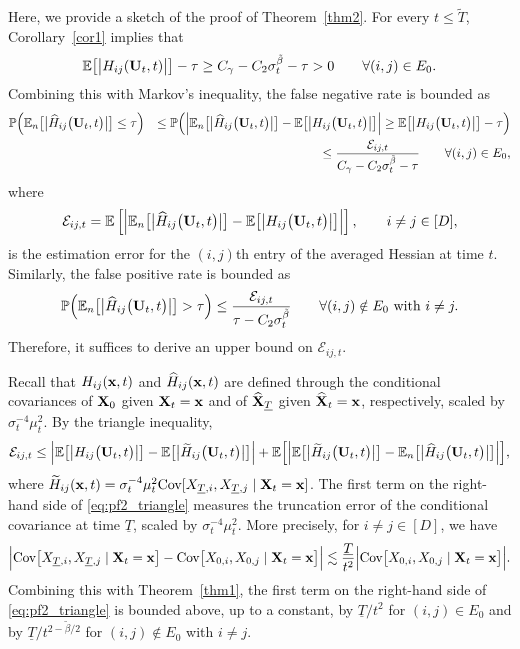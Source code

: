 \documentclass[11pt,a4paper,final]{article}
\numberwithin{equation}{section}
\theoremstyle{remark}
\def\cE{\mathcal E}
\newcommand{\bU}{{\bf U}}
\newcommand{\bx}{{\bf x}}
\newcommand{\bX}{{\bf X}}
\newcommand{\bbE}{{\mathbb E}}
\newcommand{\bbP}{{\mathbb P}}
\newcommand{\be}{\begin{equation}}
\newcommand{\ee}{\end{equation}}
\newcommand{\bean}{\setlength\arraycolsep{1pt}\begin{eqnarray*}}
\newcommand{\eean}{\end{eqnarray*}}
\begin{document}
Here, we provide a sketch of the proof of Theorem~\ref{thm2}.
For every $t \leq {\widetilde T}$, Corollary~\ref{cor1} implies that
\bean
\bbE \big[ \big\vert H_{ij} (\bU_{t},t) \big\vert \big] -\tau \geq C_{\gamma} - C_{2} \sigma_{t}^{\tilde \beta} - \tau > 0
\qquad  \forall (i,j) \in E_{0}.
\eean
Combining this with Markov's inequality, the false negative rate is bounded as
\bean
\bbP  \Big( \bbE_{n} \big[  \big\vert \widehat H_{ij} \big( \bU_{t} , t \big)  \big\vert \big] \leq \tau \Big)
&& \leq  \bbP \Big( \Big\vert \bbE_{n} \big[  \big\vert \widehat H_{ij} \big( \bU_{t} , t \big)  \big\vert \big] - \bbE \big[  \big\vert  H_{ij} \big(  \bU_{t} , t \big)  \big\vert \big] \Big\vert
\geq \bbE \big[  \big\vert  H_{ij} \big( \bU_{t}, t \big)  \big\vert \big]  - \tau
\Big)
\\
&& \leq \frac{\cE_{ij,t}}{ C_{\gamma} - C_{2} \sigma_{t}^{\tilde \beta} - \tau } \qquad \forall (i,j) \in E_{0},
\eean
where
\bean
\cE_{ij,t}
= \bbE \left[ \Big\vert \bbE_{n} \big[  \big\vert \widehat H_{ij} \big( \bU_{t} , t \big)  \big\vert \big]
- \bbE \big[  \big\vert  H_{ij} \big(  \bU_{t} , t \big)  \big\vert \big] \Big\vert \right],
\qquad i \neq j \in [D],
\eean
is the estimation error for the $(i,j)$th entry of the averaged Hessian at time $t$.
Similarly, the false positive rate is bounded as
\bean
\bbP  \Big( \bbE_{n} \big[  \big\vert \widehat H_{ij} \big( \bU_{t} , t \big)  \big\vert \big] > \tau \Big)
\leq \frac{\cE_{ij,t}}{ \tau - C_{2} \sigma_{t}^{\tilde \beta} }
\qquad \forall (i,j) \notin E_{0} \text{ with } i \neq j.
\eean
Therefore, it suffices to derive an upper bound on $\cE_{ij,t}$.

Recall that $H_{ij}(\bx,t)$ and $\widehat H_{ij}(\bx,t)$ are defined through the conditional covariances of $\bX_{0}$ given $\bX_{t} = \bx$ and of $\widehat \bX_{\underline{T}}$ given $\widehat \bX_{t} = \bx$, respectively, scaled by $\sigma_{t}^{-4}\mu_{t}^2$.
By the triangle inequality,
\be
\cE_{ij,t}
\leq 
 \Big\vert  \bbE \big[  \big\vert H_{ij} \big( \bU_{t}, t \big)  \big\vert  \big] -  \bbE \big[   \big\vert \widetilde H_{ij} \big( \bU_{t}, t \big)  \big\vert \big]  \Big\vert 
 +
 \bbE \Big[  \Big\vert \bbE \big[  \big\vert \widetilde H_{ij} \big( \bU_{t}, t \big)  \big\vert \big] - \bbE_{n} \big[  \big\vert \widehat H_{ij} \big( \bU_{t}, t \big)  \big\vert \big] \Big\vert  \Big],
 \label{eq:pf2_triangle}
\ee
where $\widetilde H_{ij} (\bx,t) = \sigma_{t}^{-4} \mu_{t}^2 \text{Cov} [ X_{\underline{T}, i}, X_{\underline{T}, j} \mid \bX_{t} = \bx ]$.
The first term on the right-hand side of \eqref{eq:pf2_triangle} measures the truncation error of the conditional covariance at time $\underline{T}$, scaled by $\sigma_{t}^{-4} \mu_{t}^2$.
More precisely, for $i \neq j \in [D]$, we have
\bean
\Big\vert \text{Cov} \big[ X_{\underline{T},i}, X_{\underline{T},j} \mid \bX_{t} = \bx \big] - \text{Cov} \big[ X_{0,i}, X_{0,j} \mid \bX_{t} = \bx \big] \Big\vert
\lesssim 
\frac{\underline{T}}{t^{2}} \Big\vert \text{Cov} \big[ X_{0,i}, X_{0,j} \mid \bX_{t} = \bx \big] \Big\vert.
\eean
Combining this with Theorem~\ref{thm1}, the first term on the right-hand side of \eqref{eq:pf2_triangle} is bounded above, up to a constant, by $\underline{T}/t^{2}$ for $(i,j) \in E_{0}$ and by $\underline{T}/t^{2-\tilde \beta / 2}$ for $(i,j) \notin E_{0}$ with $i \neq j$.
\end{document}
